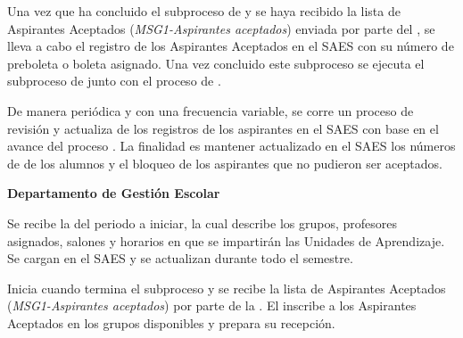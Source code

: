 \begin{PDescripcion}
\begin{enumerate}
		 Una vez que ha concluido el subproceso de  y se haya recibido la lista de Aspirantes Aceptados ({\em MSG1-Aspirantes aceptados}) enviada por parte del , se lleva a cabo el registro de los Aspirantes Aceptados en el SAES con su número de preboleta o boleta asignado. Una vez concluido este subproceso se ejecuta el subproceso de  junto con el proceso de .

		
		 De manera periódica y con una frecuencia variable, se corre un proceso de revisión y actualiza de los registros de los aspirantes en el SAES con base en el avance del proceso . La finalidad es mantener actualizado en el SAES los números de  de los alumnos y el bloqueo de los aspirantes que no pudieron ser aceptados.
	\end{enumerate}
	
	\Ppaso \textbf{Departamento de Gestión Escolar}
	
	\begin{enumerate}
		 Se recibe la  del periodo a iniciar, la cual describe los grupos, profesores asignados, salones y  horarios en que se impartirán las Unidades de Aprendizaje. Se cargan en el SAES y se actualizan durante todo el semestre.

		 Inicia cuando termina el subproceso  y se recibe  la lista de Aspirantes Aceptados ({\em MSG1-Aspirantes aceptados}) por parte de la . El  inscribe a los Aspirantes Aceptados en los grupos disponibles y prepara su recepción.


\end{enumerate}
\end{PDescripcion}
